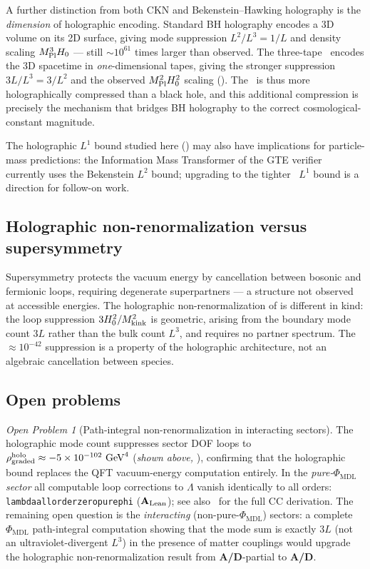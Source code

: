 \documentclass[11pt]{article}
\theoremstyle{remark}
\newtheorem{openprob}{Open Problem}
\newcommand{\PHIMDL}{\Phi_{\mathrm{MDL}}}
\newcommand{\lean}[1]{%
  \penalty-100
  \begingroup\def\_{\textunderscore\allowbreak}\texttt{#1}\endgroup}
\newcommand{\Mkink}{M_{\rm kink}}
\newcommand{\MPl}{M_{\rm Pl}}
\newcommand{\Hnought}{H_0}
\newcommand{\CMCA}{\text{CMCA}}
\newcommand{\CatAL}{\ensuremath{\textbf{A}_{\rm Lean}}}
\newcommand{\CatAD}{\textbf{A/D}}
\begin{document}
A further distinction from both CKN and Bekenstein--Hawking holography is the
\emph{dimension} of holographic encoding. Standard BH holography encodes a 3D volume
on its 2D surface, giving mode suppression $L^2/L^3 = 1/L$ and density scaling
$\MPl^3\Hnought$ --- still $\sim 10^{61}$ times larger than observed. The three-tape
\CMCA\ encodes the 3D spacetime in \emph{one}-dimensional tapes, giving the stronger
suppression $3L/L^3 = 3/L^2$ and the observed $\MPl^2\Hnought^2$ scaling
(). The \CMCA\ is thus more holographically compressed than a
black hole, and this additional compression is precisely the mechanism that bridges
BH holography to the correct cosmological-constant magnitude.

The holographic $L^{1}$ bound studied here () may also have implications for particle-mass predictions: the Information Mass Transformer of the GTE verifier~\cite{Spivack2026_SM_UGP} currently uses the Bekenstein $L^{2}$ bound; upgrading to the tighter \CMCA\ $L^{1}$ bound is a direction for follow-on work.

\subsection{Holographic non-renormalization versus supersymmetry}
\label{sec:disc-nrt}

Supersymmetry protects the vacuum energy by cancellation between bosonic and
fermionic loops, requiring degenerate superpartners --- a structure not observed at
accessible energies. The holographic non-renormalization of  is
different in kind: the loop suppression $3\Hnought^2/\Mkink^2$ is geometric,
arising from the boundary mode count $3L$ rather than the bulk count $L^3$, and
requires no partner spectrum. The $\approx 10^{-42}$ suppression is a property of
the holographic architecture, not an algebraic cancellation between species.

\subsection{Open problems}
\label{sec:open}

\begin{openprob}[Path-integral non-renormalization in interacting sectors]
The holographic mode count suppresses sector DOF loops to
$\rho_{\rm graded}^{\rm holo} \approx -5\times10^{-102}~\text{GeV}^4$
(\textit{shown above, }), confirming that the holographic bound
replaces the QFT vacuum-energy computation entirely.
In the \emph{pure-$\PHIMDL$ sector} all computable loop corrections to $\Lambda$
vanish identically to all orders: \lean{lambda\_all\_order\_zero\_pure\_phi}
(\CatAL{}); see also~\cite{SpivackGTECompleteFramework} for the full CC derivation.
The remaining open question is the \emph{interacting} (non-pure-$\PHIMDL$) sectors:
a complete $\PHIMDL$ path-integral computation showing that the mode sum is exactly
$3L$ (not an ultraviolet-divergent $L^3$) in the presence of matter couplings would
upgrade the holographic non-renormalization result from \CatAD-partial to \CatAD{}.
\end{openprob}
\end{document}
